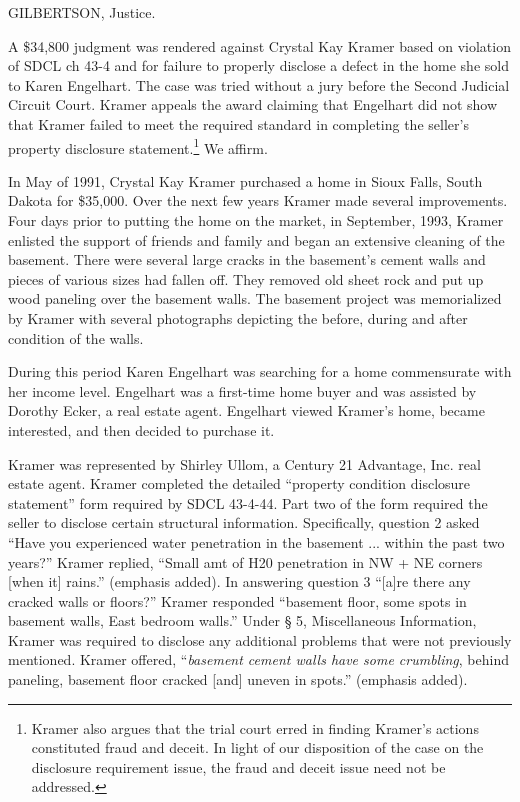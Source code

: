 

GILBERTSON, Justice.

A \$34,800 judgment was rendered against Crystal Kay Kramer based on violation
of SDCL ch 43-4 and for failure to properly disclose a defect in the home she
sold to Karen Engelhart. The case was tried without a jury before the Second
Judicial Circuit Court. Kramer appeals the award claiming that Engelhart did
not show that Kramer failed to meet the required standard in completing the
seller's property disclosure statement.\footnote{ Kramer also argues that the
trial court erred in finding Kramer's actions constituted fraud and deceit. In
light of our disposition of the case on the disclosure requirement issue, the
fraud and deceit issue need not be addressed.} We affirm.


In May of 1991, Crystal Kay Kramer purchased a home in Sioux Falls, South Dakota
for \$35,000. Over the next few years Kramer made several improvements. Four
days prior to putting the home on the market, in September, 1993, Kramer
enlisted the support of friends and family and began an extensive cleaning of
the basement. There were several large cracks in the basement's cement walls
and pieces of various sizes had fallen off. They removed old sheet rock and put
up wood paneling over the basement walls. The basement project was memorialized
by Kramer with several photographs depicting the before, during and after
condition of the walls.

During this period Karen Engelhart was searching for a home commensurate with
her income level. Engelhart was a first-time home buyer and was assisted by
Dorothy Ecker, a real estate agent. Engelhart viewed Kramer's home, became
interested, and then decided to purchase it.

Kramer was represented by Shirley Ullom, a Century 21 Advantage, Inc. real
estate agent. Kramer completed the detailed ``property condition disclosure
statement'' form required by SDCL 43-4-44. Part two of the form required the
seller to disclose certain structural information. Specifically, question 2
asked ``Have you experienced water penetration in the basement ... within the
past two years?'' Kramer replied, ``Small amt of H20 penetration in NW + NE
corners [when it] rains.'' (emphasis added). In answering question 3 ``[a]re
there any cracked walls or floors?'' Kramer responded ``basement floor, some
spots in basement walls, East bedroom walls.'' Under {\S} 5, Miscellaneous
Information, Kramer was required to disclose any additional problems that were
not previously mentioned. Kramer offered, ``\textit{basement cement walls have
some crumbling}, behind paneling, basement floor cracked [and] uneven in
spots.'' (emphasis added).

